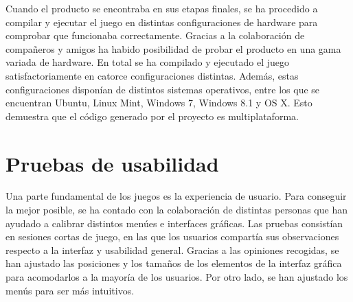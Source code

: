 	Cuando el producto se encontraba en sus etapas finales, se ha procedido a compilar y ejecutar el juego en distintas configuraciones de hardware para comprobar que funcionaba correctamente. Gracias a la colaboración de compañeros y amigos ha habido posibilidad de probar el producto en una gama variada de hardware. En total se ha compilado y ejecutado el juego satisfactoriamente en catorce configuraciones distintas. Además, estas configuraciones disponían de distintos sistemas operativos, entre los que se encuentran Ubuntu, Linux Mint, Windows 7, Windows 8.1 y OS X. Esto demuestra que el código generado por el proyecto es multiplataforma.

\section{Pruebas de usabilidad}

	Una parte fundamental de los juegos es la experiencia de usuario. Para conseguir la mejor posible, se ha contado con la colaboración de distintas personas que han ayudado a calibrar distintos menúes e interfaces gráficas. Las pruebas consistían en sesiones cortas de juego, en las que los usuarios compartía sus observaciones respecto a la interfaz y usabilidad general. Gracias a las opiniones recogidas, se han ajustado las posiciones y los tamaños de los elementos de la interfaz gráfica para acomodarlos a la mayoría de los usuarios. Por otro lado, se han ajustado los menús para ser más intuitivos.
